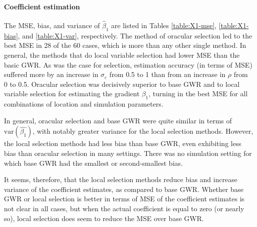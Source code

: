 \documentclass[authoryear, review, 11pt]{elsarticle}
\begin{document}
	
	\paragraph{Coefficient estimation} The MSE, bias, and variance of $\hat{\beta}_1$ are listed in Tables \ref{table:X1-mse}, \ref{table:X1-bias}, and \ref{table:X1-var}, respectively. The method of oracular selection led to the best MSE in 28 of the 60 cases, which is more than any other single method. In general, the methods that do local variable selection had lower MSE than the basic GWR. As was the case for selection, estimation accuracy (in terms of MSE) suffered more by an increase in $\sigma_{\varepsilon}$ from 0.5 to 1 than from an increase in $\rho$ from 0 to 0.5. Oracular selection was decisively superior to base GWR and to local variable selection for estimating the gradient $\beta_1$, turning in the best MSE for all combinations of location and simulation parameters.
	
	In general, oracular selection and base GWR were quite similar in terms of $\text{var}\left(\hat{\beta_1}\right)$, with notably greater variance for the local selection methods. However, the local selection methods had less bias than base GWR, even exhibiting less bias than oracular selection in many settings. There was no simulation setting for which base GWR had the smallest or second-smallest bias.
	
	It seems, therefore, that the local selection methods reduce bias and increase variance of the coefficient estimates, as compared to base GWR. Whether base GWR or local selection is better in terms of MSE of the coefficient estimates is not clear in all cases, but when the actual coefficient is equal to zero (or nearly so), local selection does seem to reduce the MSE over base GWR.
	
	
\end{document}
